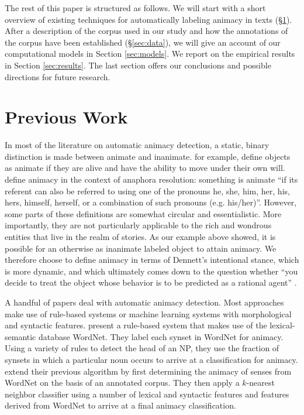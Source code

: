 \documentclass[a4paper,UKenglish]{oasics}
\begin{document}
The rest of this paper is structured as follows. We will start with a
short overview of existing techniques for automatically labeling animacy in texts (\S\ref{sec:previous-work}). After a description of the corpus
used in our study and how the annotations of the corpus have been
established (\S\ref{sec:data}), we will give an account of our
computational models in Section \ref{sec:models}. We report on the
empirical results in Section \ref{sec:results}. The last section
offers our conclusions and possible directions for future research.


\section{Previous Work}\label{sec:previous-work}

In most of the literature on automatic animacy detection, a static, binary distinction is made
between animate and inanimate. \cite{bowman:12}
for example, define objects as animate if they are alive and have
the ability to move under their own will. \cite{orasan:07} define
animacy in the context of anaphora resolution: something is animate ``if its referent can
also be referred to using one of the pronouns he, she, him, her, his,
hers, himself, herself, or a combination of such pronouns
(e.g. his/her)''. However, some parts of these definitions are somewhat
circular and essentialistic. More importantly, they are not
particularly applicable to the rich and wondrous entities that live in
the realm of stories. As our example above showed, it is possible for an otherwise as inanimate labeled object to attain animacy. We therefore choose to define animacy in terms of
Dennett's intentional stance, which is more dynamic, and which ultimately comes down to the question whether
``you decide to treat the object whose behavior is to be predicted as
a rational agent'' \cite[pp. 17]{dennett:96}.

A handful of papers deal with automatic animacy detection. Most
approaches make use of rule-based systems or machine learning systems
with morphological and syntactic features. \cite{evans:00} present a
rule-based system that makes use of the lexical-semantic database
WordNet. They label each synset in WordNet for animacy. Using a
variety of rules to detect the head of an NP, they use the fraction of
synsets in which a particular noun occurs to arrive at a
classification for animacy. \cite{orasan:01} extend their previous
algorithm by first determining the animacy of senses from WordNet on
the basis of an annotated corpus. They then apply a $k$-nearest
neighbor classifier using a number of lexical and syntactic features
and features derived from WordNet to arrive at a final animacy
classification.
\end{document}
